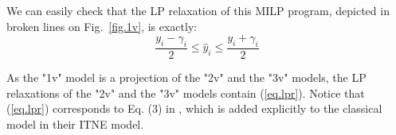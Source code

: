     We can easily check that the LP relaxation of this MILP program,
	depicted in broken lines on Fig.~\ref{fig.1v}, is exactly: 
    \begin{equation}
		\label{eq.lpr}
	  \frac{y_i-\gamma_i}{2} \leq \hat{y}_i \leq \frac{y_i+\gamma_i}{2}
	\end{equation}

	As the "1v" model is a projection of the "2v" and the "3v" models, 
	the LP relaxations of the "2v" and the "3v" models contain (\ref{eq.lpr}).
	Notice that (\ref{eq.lpr}) corresponds to Eq. (3) in \cite{lipshitz}, 
	which is added explicitly to the classical model in their ITNE model.
	
    
	
	

	\iffalse
	Based on above constraints, we can sketch this simplified model:
	\begin{enumerate}
		\item For each input node, each output node, and each pre-activation and post-activation node in the hidden layers,  set one variable $y_i$. 
		\item Set constraints for input nodes.
		\item Set linear constraints . In this case, since the meaning of $y_i$ is $x_i-x'_i$, this constraints will not use the bias.
		\item Between pre- and post- activation nodes, set the MILP constraint described above.
	\end{enumerate}
	
	The key point is that, although this model sets 3 variables (and their binary variables) for each node in the network, only $y_i$  contributes to the final results, and we can ignore $x_i,x_i'$ (and their binary variables) during the optimization.
	
	As a result, we can relax the binary variables used to $\hat{x}_i = \ReLU(x_i)$ and $\hat{x}'_i = \ReLU(x'_i)$.
	\fi

    


    